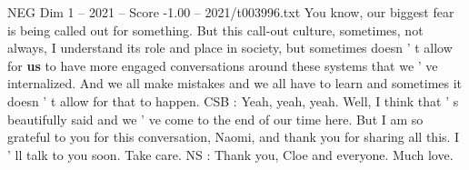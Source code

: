 \begin{textsample}{NEG Dim 1 – 2021 – Score -1.00 – 2021/t003996.txt}
You know, our biggest fear is being called out for something.
But this call-out culture, sometimes, not always, I understand its role and place in society, but sometimes doesn ' t allow for \textbf{us} to have more engaged conversations around these systems that we ' ve internalized.
And we all make mistakes and we all have to learn and sometimes it doesn ' t allow for that to happen.
CSB : Yeah, yeah, yeah.
Well, I think that ' s beautifully said and we ' ve come to the end of our time here.
But I am so grateful to you for this conversation, Naomi, and thank you for sharing all this.
I ' ll talk to you soon.
Take care.
NS : Thank you, Cloe and everyone.
Much love.

\end{textsample}
